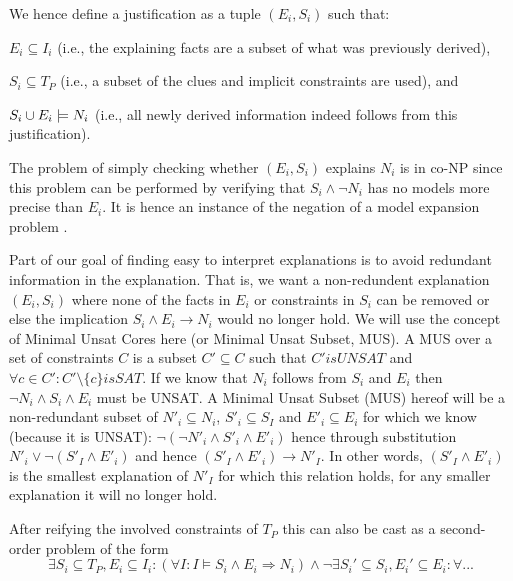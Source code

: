 We hence define a justification as a tuple $(E_i,S_i)$ such that: 
\begin{compactitem}
	\item $E_i\subseteq I_i$ (i.e., the explaining facts are a subset of what was previously derived),
	\item $S_i \subseteq T_P$ (i.e., a subset of the clues and implicit constraints are used), and 
	\item $S_i \cup E_i \models N_i$ (i.e., all newly derived information indeed follows from this justification).
\end{compactitem}

The problem of simply checking whether $(E_i,S_i)$ explains $N_i$ is in co-NP since this problem can be performed by verifying that $S_i \land \lnot N_i$ has no models more precise than $E_i$. It is hence an instance of the negation of a model expansion problem \cite{ternovskaMXcomplexity}.


Part of our goal of finding easy to interpret explanations is to avoid redundant information in the explanation. That is, we want a non-redundent explanation $(E_i,S_i)$ where none of the facts in $E_i$ or constraints in $S_i$ can be removed or else the implication $S_i \wedge E_i \rightarrow N_i$ would no longer hold. We will use the concept of Minimal Unsat Cores here (or Minimal Unsat Subset, MUS). A MUS over a set of constraints $C$ is a subset $C' \subseteq C$ such that $C' is UNSAT$ and $\forall c \in C': C' \setminus \{c\} is SAT$. If we know that $N_i$ follows from $S_i$ and $E_i$ then $\neg N_i \wedge S_i \wedge E_i$ must be UNSAT. A Minimal Unsat Subset (MUS) hereof will be a non-redundant subset of $N'_i \subseteq N_i$, $S'_i \subseteq S_I$ and $E'_i \subseteq E_i$ for which we know (because it is UNSAT): $\neg (\neg N'_i \wedge S'_i \wedge E'_i)$ hence through substitution $N'_i \vee \neg (S'_I \wedge E'_i)$ and hence $(S'_I \wedge E'_i) \rightarrow N'_I$. In other words, $(S'_I \wedge E'_i)$ is the smallest explanation of $N'_I$ for which this relation holds, for any smaller explanation it will no longer hold.


After reifying the involved constraints of $T_P$ this can also be cast as a second-order problem of the form
\[\exists S_i\subseteq T_P, E_i\subseteq I_i: (\forall I: I\models S_i\land E_i \Rightarrow N_i) \land \lnot \exists S_i'\subseteq S_i, E_i'\subseteq E_i: \forall ... \]


